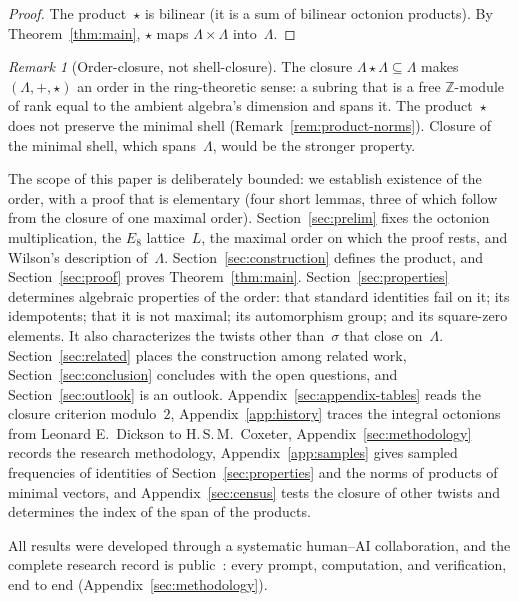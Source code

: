 \documentclass[twoside,english]{paper}
\numberwithin{equation}{section}
\numberwithin{figure}{section}
\theoremstyle{definition}
\theoremstyle{remark}
\newtheorem{remark}[theorem]{Remark}
\newcommand{\ZZ}{\mathbb{Z}}
\newcommand{\LL}{\Lambda}             %
\begin{document}
\begin{proof}
The product~$\star$ is bilinear (it is a sum of bilinear octonion
products).  By Theorem~\ref{thm:main}, $\star$ maps $\LL \times \LL$
into~$\LL$.
\end{proof}

\begin{remark}[Order-closure, not shell-closure]\label{rem:order-closure}
The closure $\LL \star \LL \subseteq \LL$ makes $(\LL, +, \star)$ an
order in the ring-theoretic sense: a subring that is a free
$\ZZ$-module of rank equal to the ambient algebra's dimension and spans
it.  The
product~$\star$ does not preserve the minimal shell
(Remark~\ref{rem:product-norms}).
Closure of the minimal shell, which spans~$\LL$, would be the stronger
property.
\end{remark}

The scope of this paper is deliberately bounded: we establish
existence of the order, with a proof that is elementary (four short
lemmas, three of which follow from the closure of one maximal
order).  Section~\ref{sec:prelim} fixes the octonion
multiplication, the $E_8$ lattice~$L$, the maximal order on which the
proof rests, and Wilson's description of~$\LL$.
Section~\ref{sec:construction} defines the product, and
Section~\ref{sec:proof} proves Theorem~\ref{thm:main}.
Section~\ref{sec:properties} determines algebraic properties of the
order: that standard identities fail on it; its idempotents; that it is
not maximal; its automorphism group; and its square-zero elements.  It
also characterizes the twists other than~$\sigma$ that close on~$\LL$.
Section~\ref{sec:related} places the construction among related work,
Section~\ref{sec:conclusion} concludes with the open questions, and
Section~\ref{sec:outlook} is an outlook.  Appendix~\ref{sec:appendix-tables}
reads the closure criterion modulo~$2$, Appendix~\ref{app:history} traces
the integral octonions from Leonard E.~Dickson to H.\,S.\,M.~Coxeter,
Appendix~\ref{sec:methodology} records the research methodology,
Appendix~\ref{app:samples} gives sampled frequencies of identities of
Section~\ref{sec:properties} and the norms of products of minimal
vectors, and Appendix~\ref{sec:census} tests the closure of other twists
and determines the index of the span of the products.

All results were developed through a systematic human--AI
collaboration, and the complete research record is public~\cite{repo}:
every prompt, computation, and verification, end to end
(Appendix~\ref{sec:methodology}).
\end{document}
